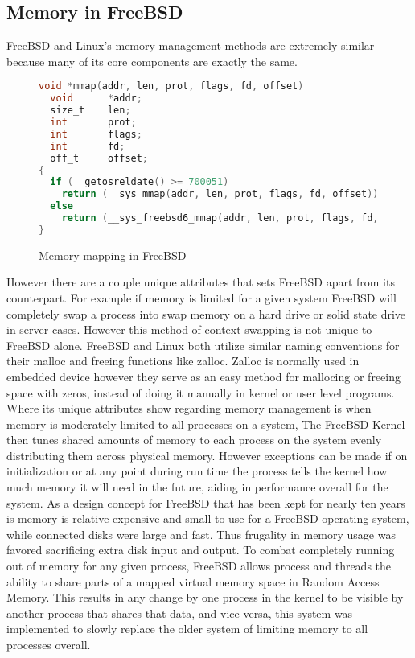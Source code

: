\subsection{Memory in FreeBSD}
FreeBSD and Linux's memory management methods are extremely similar because many of its core components are exactly the same.
\begin{figure}[h]
\begin{lstlisting}[language=C, style=customc]
void *mmap(addr, len, prot, flags, fd, offset)
  void		*addr;
  size_t	len;
  int		prot;
  int		flags;
  int		fd;
  off_t		offset;
{
  if (__getosreldate() >= 700051)
    return (__sys_mmap(addr, len, prot, flags, fd, offset));
  else
    return (__sys_freebsd6_mmap(addr, len, prot, flags, fd, 0, offset));
}
\end{lstlisting}
\caption{ Memory mapping in FreeBSD\cite{mmapcinf8:online}}
\end{figure}

However there are a couple unique attributes that sets FreeBSD apart from its counterpart. For example if memory is limited for a given system FreeBSD will completely swap a process into swap memory on a hard drive or solid state drive in server cases. However this method of context swapping is not unique to FreeBSD alone. FreeBSD and Linux both utilize similar naming conventions for their malloc and freeing functions like zalloc. Zalloc is normally used in embedded device however they serve as an easy method for mallocing or freeing space with zeros, instead of doing it manually in kernel or user level programs\cite{freeBsdBook}. Where its unique attributes show regarding memory management is when memory is moderately limited to all processes on a system, The FreeBSD Kernel then tunes shared amounts of memory to each process on the system evenly distributing them across physical memory\cite{25Memory88:online}. However exceptions can be made if on initialization or at any point during run time the process tells the kernel how much memory it will need in the future, aiding in performance overall for the system. As a design concept for FreeBSD that has been kept for nearly ten years is memory is relative expensive and small to use for a FreeBSD operating system, while connected disks were large and fast. Thus frugality in memory usage was favored sacrificing extra disk input and output\cite{freeBsdBook}. To combat completely running out of memory for any given process, FreeBSD allows process and threads the ability to share parts of a mapped virtual memory space in Random Access Memory. This results in any change by one process in the kernel to be visible by another process that shares that data, and vice versa, this system was implemented to slowly replace the older system of limiting memory to all processes overall.
